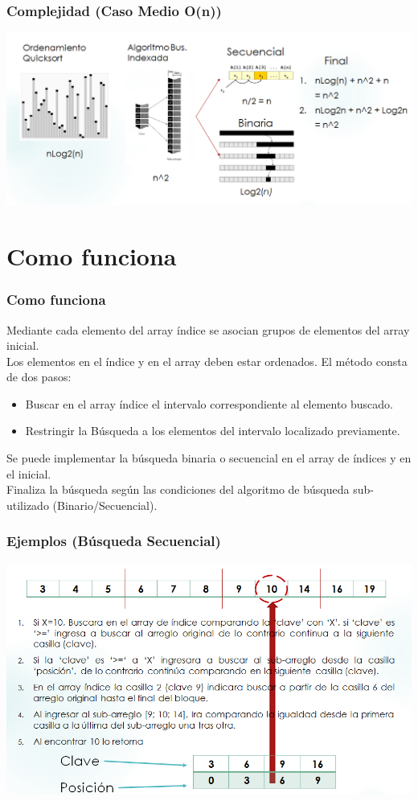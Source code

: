 \documentclass[hyperref={pdfpagelabels=false}]{beamer}
\begin{document}
\begin{frame}
\frametitle{Complejidad (Caso Medio O(n))}
\includegraphics[width=1.1\textwidth]{casoMedio.png}
\end{frame}


\section{Como funciona}
\begin{frame}
\frametitle{Como funciona}
Mediante cada elemento del array \'indice se asocian grupos de elementos del array inicial.\\
Los elementos en el \'indice y en el array deben estar ordenados. 
El m\'etodo consta de dos pasos:\\

\begin{itemize}
\item Buscar en el array \'indice el intervalo correspondiente al elemento buscado.\\
\item Restringir la B\'usqueda a los elementos del intervalo localizado previamente.  
\end{itemize}

Se puede implementar la b\'usqueda binaria o secuencial en el array de \'indices y en el inicial.\\
Finaliza la b\'usqueda seg\'un las condiciones del algoritmo de b\'usqueda sub-utilizado (Binario/Secuencial).
\end{frame}

\begin{frame}
\frametitle{Ejemplos (B\'usqueda Secuencial)}
\includegraphics[width=1.0\textwidth]{busqSecuencial.png}
\end{frame}
\end{document}
